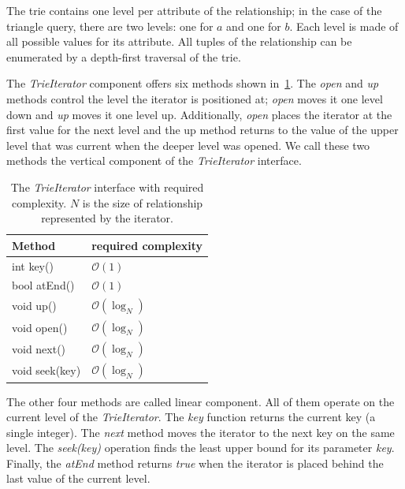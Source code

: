 The trie contains one level per attribute of the relationship;
in the case of the triangle query, there are two levels: one for $a$ and one for $b$.
Each level is made of all possible values for its attribute.
All tuples of the relationship can be enumerated by a depth-first traversal of the trie.

The \textit{TrieIterator} component offers six methods shown in~\cref{table:trieIterator-interface}.
The \textit{open} and \textit{up} methods control the level the iterator is positioned at;
\textit{open} moves it one level down and \textit{up} moves it one level up.
Additionally, \textit{open} places the iterator at the first value for the next level and the up
method returns to the value of the upper level that was current when the deeper level was opened.
We call these two methods the vertical component of the \textit{TrieIterator} interface.

\begin{table}
    \centering
    \begin{tabular}{@{}ll@{}}
        \toprule
        Method         & required complexity    \\
        \midrule
        int key()      &  $\mathcal{O}(1)$       \\
        bool atEnd()   &  $\mathcal{O}(1)$       \\
        void up()      &  $\mathcal{O}(\log_N)$  \\
        void open()    &  $\mathcal{O}(\log_N)$  \\
        void next()    &  $\mathcal{O}(\log_N)$  \\
        void seek(key) &  $\mathcal{O}(\log_N)$  \\
        \bottomrule
    \end{tabular}
    \caption{
      The \textit{TrieIterator} interface with required complexity.
      $N$ is the size of relationship represented by the iterator.
    }
    \label{table:trieIterator-interface}
\end{table}

The other four methods are called linear component.
All of them operate on the current level of the \textit{TrieIterator}.
The \textit{key} function returns the current key (a single integer).
The \textit{next} method moves the iterator to the next key on the same level.
The \textit{seek(key)} operation finds the least upper bound for its parameter \textit{key}.
Finally, the \textit{atEnd} method returns \textit{true} when the iterator is placed behind the last value of the current level.

